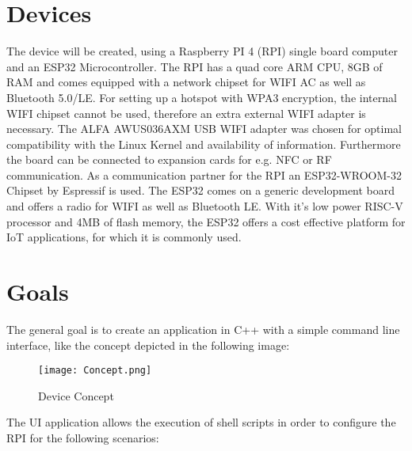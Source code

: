 \documentclass{article}
\begin{document}
\section{Devices}

The device will be created, using a Raspberry PI 4 (RPI) single board computer and an ESP32 Microcontroller. 
The RPI has a quad core ARM CPU, 8GB of RAM and comes equipped with a network chipset for WIFI AC as well as Bluetooth 5.0/LE. 
For setting up a hotspot with WPA3 encryption, the internal WIFI chipset cannot be used, therefore an extra external WIFI adapter is necessary.
The ALFA AWUS036AXM USB WIFI adapter was chosen for optimal compatibility with the Linux Kernel and availability of information.
Furthermore the board can be connected to expansion cards for e.g. NFC or RF communication.
As a communication partner for the RPI an ESP32-WROOM-32 Chipset by Espressif is used. The ESP32 comes on a generic development board and offers a radio for WIFI as well as Bluetooth LE.
With it's low power RISC-V processor and 4MB of flash memory, the ESP32 offers a cost effective platform for IoT applications, for which it is commonly used. 



\section{Goals}

The general goal is to create an application in C++ with a simple command line interface, like the concept depicted in the following image:

\vfill

\begin{figure}[H]
    \centering
    \texttt{[image: Concept.png]}
    \caption{Device Concept}
    \label{fig:image1}
\end{figure}

The UI application allows the execution of shell scripts in order to configure the RPI for the following scenarios:
\end{document}
